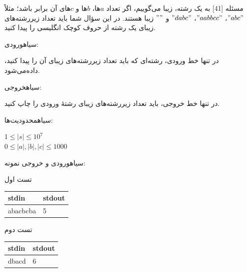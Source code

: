 ‌مسئله [41]
به یک رشته، زیبا می‌گوییم، اگر تعداد $a$ها، $b$ها و $c$های آن برابر باشد؛ مثلاً $"abc"$، $"aabbcc"$، $"dabc"$ و $""$ زیبا هستند.
در این سؤال شما باید تعداد زیررشته‌های زیبای یک رشته از حروف کوچک انگلیسی را پیدا کنید.

‌سیاه{ورودی:}
\par
در تنها خط ورودی، رشته‌ای که باید تعداد زیررشته‌های زیبای آن را پیدا کنید، داده‌می‌شود.
\par
{}‌سیاه{خروجی:}
\par
در تنها خط خروجی، باید تعداد زیررشته‌های زیبای رشتهٔ ورودی را چاپ کنید.
\par
{}‌سیاه{محدودیت‌ها:}
\par
$1 \leq |s| \leq 10^7$\\
$0 \leq |a|, |b|, |c| \leq 1000$\par

‌سیاه{ورودی و خروجی نمونه:}
\par
تست اول
\begin{latin}
	\begin{tabularx}{\textwidth}{|X | X|}
		\hline
		\textbf{stdin} &
		\textbf{stdout}\\
		\hline
		abacbcba & 5\\
		\hline
	\end{tabularx}
\end{latin}
تست دوم
\begin{latin}
	\begin{tabularx}{\textwidth}{|X | X|}
		\hline
		\textbf{stdin} &
		\textbf{stdout}\\
		\hline
		dbacd & 6\\
		\hline
	\end{tabularx}
\end{latin}







